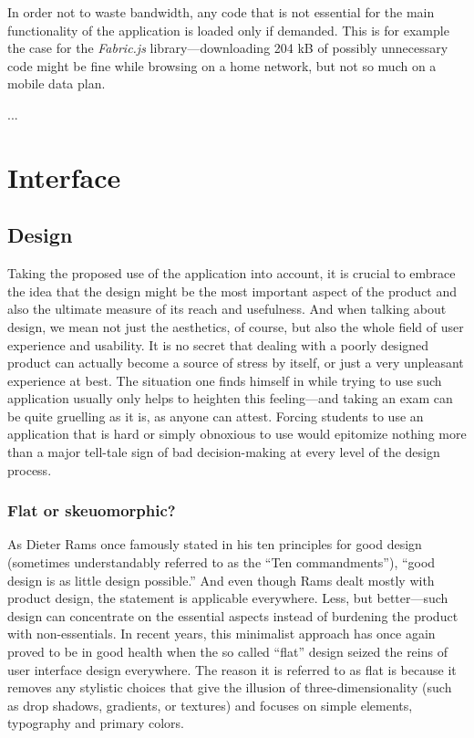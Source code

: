 \documentclass[thesis=M,english,hidelinks]{FITthesis}[2012/10/20]
\begin{document}
In order not to waste bandwidth, any code that is not essential for the main functionality of the application is loaded only if demanded. This is for example the case for the \textit{Fabric.js} library---downloading 204 kB of possibly unnecessary code might be fine while browsing on a home network, but not so much on a mobile data plan.

...

\section{Interface}

  \subsection{Design}

Taking the proposed use of the application into account, it is crucial to embrace the idea that the design might be the most important aspect of the product and also the ultimate measure of its reach and usefulness. And when talking about design, we mean not just the aesthetics, of course, but also the whole field of user experience and usability. It is no secret that dealing with a poorly designed product can actually become a source of stress by itself, or just a very unpleasant experience at best. The situation one finds himself in while trying to use such application usually only helps to heighten this feeling---and taking an exam can be quite gruelling as it is, as anyone can attest. Forcing students to use an application that is hard or simply obnoxious to use would epitomize nothing more than a major tell-tale sign of bad decision-making at every level of the design process.

    \subsubsection{Flat or skeuomorphic?}

As Dieter Rams once famously stated in his ten principles for good design (sometimes understandably referred to as the ``Ten commandments''), ``good design is as little design possible.'' And even though Rams dealt mostly with product design, the statement is applicable everywhere. Less, but better---such design can concentrate on the essential aspects instead of burdening the product with non-essentials. In recent years, this minimalist approach has once again proved to be in good health when the so called ``flat'' design seized the reins of user interface design everywhere. The reason it is referred to as flat is because it removes any stylistic choices that give the illusion of three-dimensionality (such as drop shadows, gradients, or textures) and focuses on simple elements, typography and primary colors.
\end{document}
